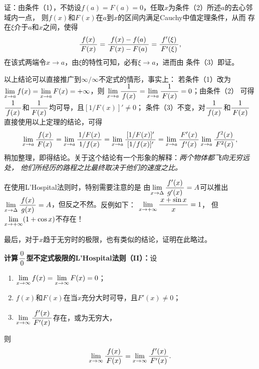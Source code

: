 证：由条件（1），不妨设$f(a)=F(a)=0$，任取$x$为条件（2）所述$a$的去心邻域内一点，
则$f(x)$和$F(x)$在$a$到$x$的区间内满足Cauchy中值定理条件，从而
存在$\xi$介于$a$和$x$之间，使得
$$\df{f(x)}{F(x)}=\df{f(x)-f(a)}{F(x)-F(a)}
=\df{f'(\xi)}{F'(\xi)},$$
在该式两端令$x\to a$，由$\xi$的特性可知，必有$\xi\to a$，进而由
条件（3）即证。\fin

\bs
以上结论可以直接推广到$\infty/\infty$不定式的情形，事实上：
若条件（1）改为$\limx{a}f(x)=\limx{a}F(x)=+\infty$，则
$\limx{a}\df1{f(x)}=\limx{a}\df1{F(x)}=0$；由条件（2）
可得$\df1{f(x)}$和$\df1{F(x)}$均可导，且$[1/F(x)]'\ne 0$；
条件（3）不变，对$\df1{f(x)}$和$\df1{F(x)}$直接使用以上定理的结论，可得
$$
	\limx{a}\df{f(x)}{F(x)}
	=\limx{a}\df{1/F(x)}{1/f(x)}
	=\limx{a}\df{[1/F(x)]'}{[1/f(x)]'}
	=\limx{a}\df{F'(x)}{f'(x)}\limx{a}\df{f^2(x)}{F^2(x)},
$$
稍加整理，即得结论。关于这个结论有一个形象的解释：{\it 两个物体都飞向无穷远处，
他们所经历的路程之比最终取决于他们的速度之比。}

\bs
在使用L'Hospital法则时，特别需要注意的是
{\baa 由$\limx{\Delta}\df{f'(x)}{g'(x)}=A$可以推出
$\limx{\Delta}\df{f(x)}{g(x)}=A$，但反之不然。}反例如下：
$\limx{+\infty}\df{x+\sin x}x=1$，
但$\limx{+\infty}(1+\cos x)$不存在！

最后，对于$x$趋于无穷时的极限，也有类似的结论，证明在此略过。

\begin{thx}
	{\bf 计算$\df00$型不定式极限的L'Hospital法则（II）：}设
	\begin{enumerate}[(1)]
	  \item $\limx{\infty}f(x)=\limx{\infty}F(x)=0$；
	  \item $f(x)$和$F(x)$在当$x$充分大时可导，且$F'(x)\ne0$；
	  \item $\limx{\infty}\df{f'(x)}{F'(x)}$存在，或为无穷大，
	\end{enumerate}
	则
	$$\limx{\infty}\df{f(x)}{F(x)}=\limx{\infty}\df{f'(x)}{F'(x)}.$$
\end{thx}

